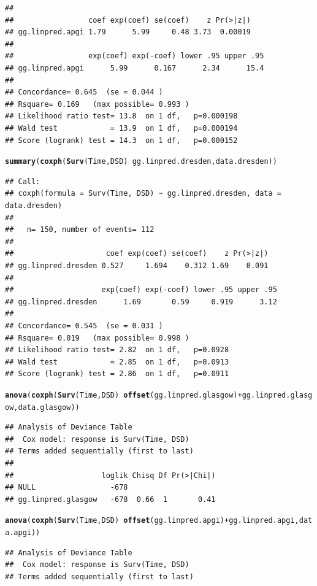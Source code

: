 \documentclass{article}\usepackage[]{graphicx}\usepackage[]{color}
\makeatletter
\newcommand{\hlopt}[1]{\textcolor[rgb]{0,0,0}{#1}}%
\newcommand{\hlstd}[1]{\textcolor[rgb]{0.345,0.345,0.345}{#1}}%
\newcommand{\hlkwd}[1]{\textcolor[rgb]{0.737,0.353,0.396}{\textbf{#1}}}%
\newenvironment{kframe}{%
 \def\at@end@of@kframe{}%
 \ifinner\ifhmode%
  \def\at@end@of@kframe{\end{minipage}}%
  \begin{minipage}{\columnwidth}%
 \fi\fi%
 \def\FrameCommand##1{\hskip\@totalleftmargin \hskip-\fboxsep
 \colorbox{shadecolor}{##1}\hskip-\fboxsep
     \hskip-\linewidth \hskip-\@totalleftmargin \hskip\columnwidth}%
 \MakeFramed {\advance\hsize-\width
   \@totalleftmargin\z@ \linewidth\hsize
   \@setminipage}}%
 {\par\unskip\endMakeFramed%
 \at@end@of@kframe}
\newenvironment{knitrout}{}{} %
\makeatother
\begin{document}
\begin{knitrout}
\begin{kframe}
\begin{verbatim}
## 
##                 coef exp(coef) se(coef)    z Pr(>|z|)
## gg.linpred.apgi 1.79      5.99     0.48 3.73  0.00019
## 
##                 exp(coef) exp(-coef) lower .95 upper .95
## gg.linpred.apgi      5.99      0.167      2.34      15.4
## 
## Concordance= 0.645  (se = 0.044 )
## Rsquare= 0.169   (max possible= 0.993 )
## Likelihood ratio test= 13.8  on 1 df,   p=0.000198
## Wald test            = 13.9  on 1 df,   p=0.000194
## Score (logrank) test = 14.3  on 1 df,   p=0.000152
\end{verbatim}
\begin{alltt}
\hlkwd{summary}\hlstd{(}\hlkwd{coxph}\hlstd{(}\hlkwd{Surv}\hlstd{(Time, DSD)} \hlopt{~} \hlstd{gg.linpred.dresden, data.dresden))}
\end{alltt}
\begin{verbatim}
## Call:
## coxph(formula = Surv(Time, DSD) ~ gg.linpred.dresden, data = data.dresden)
## 
##   n= 150, number of events= 112 
## 
##                     coef exp(coef) se(coef)    z Pr(>|z|)
## gg.linpred.dresden 0.527     1.694    0.312 1.69    0.091
## 
##                    exp(coef) exp(-coef) lower .95 upper .95
## gg.linpred.dresden      1.69       0.59     0.919      3.12
## 
## Concordance= 0.545  (se = 0.031 )
## Rsquare= 0.019   (max possible= 0.998 )
## Likelihood ratio test= 2.82  on 1 df,   p=0.0928
## Wald test            = 2.85  on 1 df,   p=0.0913
## Score (logrank) test = 2.86  on 1 df,   p=0.0911
\end{verbatim}
\begin{alltt}
\hlkwd{anova}\hlstd{(}\hlkwd{coxph}\hlstd{(}\hlkwd{Surv}\hlstd{(Time, DSD)} \hlopt{~} \hlkwd{offset}\hlstd{(gg.linpred.glasgow)} \hlopt{+} \hlstd{gg.linpred.glasgow, data.glasgow))}
\end{alltt}
\begin{verbatim}
## Analysis of Deviance Table
##  Cox model: response is Surv(Time, DSD)
## Terms added sequentially (first to last)
## 
##                    loglik Chisq Df Pr(>|Chi|)
## NULL                 -678                    
## gg.linpred.glasgow   -678  0.66  1       0.41
\end{verbatim}
\begin{alltt}
\hlkwd{anova}\hlstd{(}\hlkwd{coxph}\hlstd{(}\hlkwd{Surv}\hlstd{(Time, DSD)} \hlopt{~} \hlkwd{offset}\hlstd{(gg.linpred.apgi)} \hlopt{+} \hlstd{gg.linpred.apgi, data.apgi))}
\end{alltt}
\begin{verbatim}
## Analysis of Deviance Table
##  Cox model: response is Surv(Time, DSD)
## Terms added sequentially (first to last)

\end{verbatim}
\end{kframe}
\end{knitrout}
\end{document}
